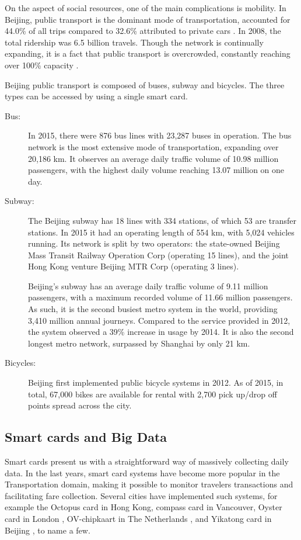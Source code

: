 \documentclass{article}
\begin{document}
On the aspect of social resources, one of the main complications is mobility. In Beijing, public transport is the dominant mode of transportation, accounted for 44.0\% of all trips compared to 32.6\% attributed to private cars \cite{mao2016commuting}. In 2008, the total ridership was 6.5 billion travels. Though the network is continually expanding, it is a fact that public transport is overcrowded, constantly reaching over 100\% capacity \cite{beijing2009research}.

Beijing public transport is composed of buses, subway and bicycles. The three types can be accessed by using a single smart card. 

\begin{description}
\item[Bus:] In 2015, there were 876 bus lines with 23,287 buses in operation. The bus network is the most extensive mode of transportation, expanding over 20,186 km. It observes an average daily traffic volume of 10.98 million passengers, with the highest daily volume reaching 13.07 million on one day. \cite{beijing2016annual}

\item[Subway:] The Beijing subway has 18 lines with 334 stations, of which 53 are transfer stations. In 2015 it had an operating length of 554 km, with 5,024 vehicles running. \cite{beijing2016annual} Its network is split by two operators: the state-owned Beijing Mass Transit Railway Operation Corp (operating 15 lines), and the joint Hong Kong venture Beijing MTR Corp (operating 3 lines).

Beijing's subway has an average daily traffic volume of 9.11 million passengers, with a maximum recorded volume of 11.66 million passengers. As such, it is the second busiest metro system in the world, providing 3,410 million annual journeys. Compared to the service provided in 2012, the system observed a 39\% increase in usage by 2014. It is also the second longest metro network, surpassed by Shanghai by only 21 km.  \cite{uitp2015world} 

\item[Bicycles:] Beijing first implemented public bicycle systems in 2012. As of 2015, in total, 67,000 bikes are available for rental with 2,700 pick up/drop off points spread across the city. \cite{beijing2016annual}
\end{description}


\subsection{Smart cards and Big Data}
Smart cards present us with a straightforward way of massively collecting daily data. In the last years, smart card systems have become more popular in the Transportation domain, making it possible to monitor travelers transactions and facilitating fare collection. Several cities have implemented such systems, for example the Octopus card in Hong Kong\cite{chau2003octopus}, compass card in Vancouver, Oyster card in London \cite{blythe2004improving}, OV-chipkaart in The Netherlands \cite{de2008analysis}, and Yikatong card in Beijing \cite{chan2010tactical}, to name a few.
\end{document}
